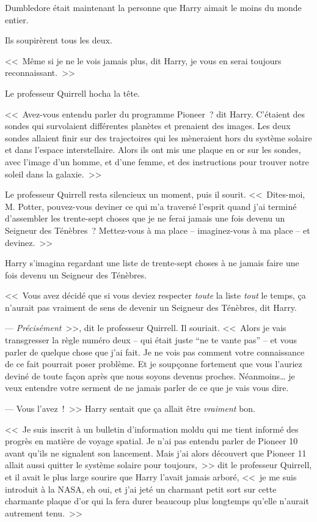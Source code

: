 Dumbledore était maintenant la personne que Harry aimait le moins du monde entier.

Ils soupirèrent tous les deux.

<<~Même si je ne le vois jamais plus, dit Harry, je vous en serai toujours reconnaissant.~>>

Le professeur Quirrell hocha la tête.

<<~Avez-vous entendu parler du programme Pioneer~? dit Harry. C'étaient des sondes qui survolaient différentes planètes et prenaient des images. Les deux sondes allaient finir sur des trajectoires qui les mèneraient hors du système solaire et dans l'espace interstellaire. Alors ils ont mis une plaque en or sur les sondes, avec l'image d'un homme, et d'une femme, et des instructions pour trouver notre soleil dans la galaxie.~>>

Le professeur Quirrell resta silencieux un moment, puis il sourit. <<~Dites-moi, M. Potter, pouvez-vous deviner ce qui m'a traversé l'esprit quand j'ai terminé d'assembler les trente-sept choses que je ne ferai jamais une fois devenu un Seigneur des Ténèbres~? Mettez-vous à ma place -- imaginez-vous à ma place -- et devinez.~>>

Harry s'imagina regardant une liste de trente-sept choses à ne jamais faire une fois devenu un Seigneur des Ténèbres.

<<~Vous avez décidé que si vous deviez respecter \emph{toute} la liste \emph{tout} le temps, ça n'aurait pas vraiment de sens de devenir un Seigneur des Ténèbres, dit Harry.

--- \emph{Précisément}~>>, dit le professeur Quirrell. Il souriait. <<~Alors je vais transgresser la règle numéro deux -- qui était juste “ne te vante pas” -- et vous parler de quelque chose que j'ai fait. Je ne vois pas comment votre connaissance de ce fait pourrait poser problème. Et je soupçonne fortement que vous l'auriez deviné de toute façon après que nous soyons devenus proches. Néanmoins… je veux entendre votre serment de ne jamais parler de ce que je vais vous dire.

--- Vous l'avez~!~>> Harry sentait que ça allait être \emph{vraiment} bon.

<<~Je suis inscrit à un bulletin d'information moldu qui me tient informé des progrès en matière de voyage spatial. Je n'ai pas entendu parler de Pioneer 10 avant qu'ils ne signalent son lancement. Mais j'ai alors découvert que Pioneer 11 allait aussi quitter le système solaire pour toujours,~>> dit le professeur Quirrell, et il avait le plus large sourire que Harry l'avait jamais arboré, <<~je me suis introduit à la NASA, eh oui, et j'ai jeté un charmant petit sort sur cette charmante plaque d'or qui la fera durer beaucoup plus longtemps qu'elle n'aurait autrement tenu.~>>

